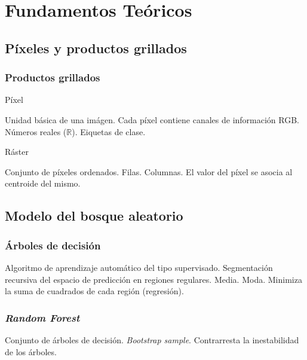 \documentclass{beamer}
\begin{document}
  \section{Fundamentos Teóricos}

  \subsection*{Píxeles y productos grillados}

  \begin{frame}
    \frametitle{Productos grillados}

    \begin{block}{Píxel}
      \begin{outline}
        \1 Unidad básica de una imágen.
        \1 Cada píxel contiene canales de información
          \2 RGB.
          \2 Números reales ($\mathbb{R}$).
          \2 Eiquetas de clase.
      \end{outline}
    \end{block}

    \begin{block}{Ráster}
      \begin{outline}
        \1 Conjunto de píxeles ordenados.
          \2 Filas.
          \2 Columnas.
        \1 El valor del píxel se asocia al centroide del mismo.
      \end{outline}
    \end{block}
  \end{frame}


  \subsection*{Modelo del bosque aleatorio}

  \begin{frame}
    \frametitle{Árboles de decisión}

    \begin{outline}
      \1  Algoritmo de aprendizaje automático del tipo supervisado.
      \1 Segmentación recursiva del espacio de predicción en regiones regulares.
        \2 Media. 
        \2 Moda.
      \1 Minimiza la suma de cuadrados de cada región (regresión).
    \end{outline}
  \end{frame}

  \begin{frame}
    \frametitle{\textit{Random Forest}}

    \begin{outline}
      \1 Conjunto de árboles de decisión.
        \2 \textit{Bootstrap sample}.
      \1 Contrarresta la inestabilidad de los árboles.
    \end{outline}
  \end{frame}
\end{document}
